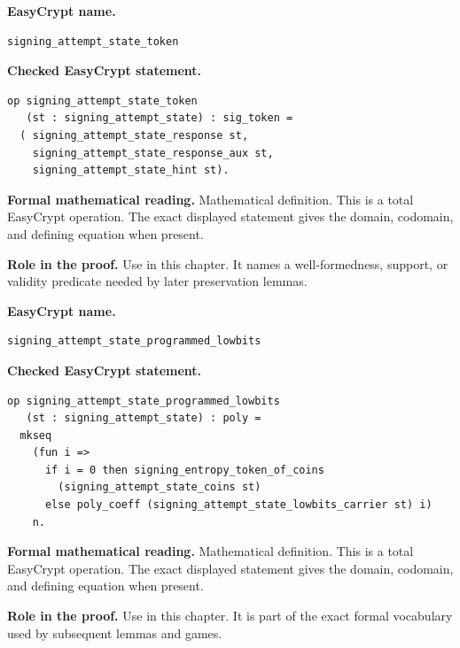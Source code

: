 \begin{formaldefinition}
\noindent\textbf{EasyCrypt name.}
\begin{lstlisting}[language=EasyCrypt,basicstyle=\ttfamily\scriptsize]
signing_attempt_state_token
\end{lstlisting}
\noindent\textbf{Checked EasyCrypt statement.}
\begin{lstlisting}[language=EasyCrypt,basicstyle=\ttfamily\scriptsize]
op signing_attempt_state_token
   (st : signing_attempt_state) : sig_token =
  ( signing_attempt_state_response st,
    signing_attempt_state_response_aux st,
    signing_attempt_state_hint st).
\end{lstlisting}
\noindent\textbf{Formal mathematical reading.}
Mathematical definition. This is a total EasyCrypt operation.  The exact displayed statement gives the domain, codomain, and defining equation when present.

\noindent\textbf{Role in the proof.}
Use in this chapter. It names a well-formedness, support, or validity predicate needed by later preservation lemmas.

\end{formaldefinition}

\begin{formaldefinition}
\noindent\textbf{EasyCrypt name.}
\begin{lstlisting}[language=EasyCrypt,basicstyle=\ttfamily\scriptsize]
signing_attempt_state_programmed_lowbits
\end{lstlisting}
\noindent\textbf{Checked EasyCrypt statement.}
\begin{lstlisting}[language=EasyCrypt,basicstyle=\ttfamily\scriptsize]
op signing_attempt_state_programmed_lowbits
   (st : signing_attempt_state) : poly =
  mkseq
    (fun i =>
      if i = 0 then signing_entropy_token_of_coins
        (signing_attempt_state_coins st)
      else poly_coeff (signing_attempt_state_lowbits_carrier st) i)
    n.
\end{lstlisting}
\noindent\textbf{Formal mathematical reading.}
Mathematical definition. This is a total EasyCrypt operation.  The exact displayed statement gives the domain, codomain, and defining equation when present.

\noindent\textbf{Role in the proof.}
Use in this chapter. It is part of the exact formal vocabulary used by subsequent lemmas and games.

\end{formaldefinition}

